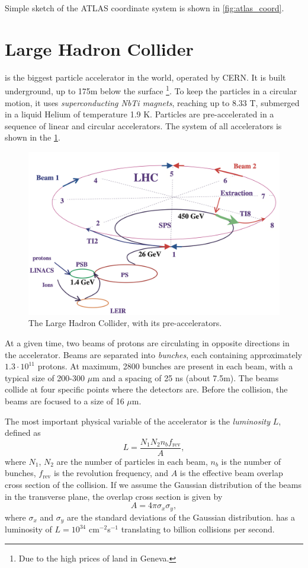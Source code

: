 Simple sketch of the ATLAS coordinate system is shown in \cref{fig:atlas_coord}.


\section{Large Hadron Collider}
\label{sec:lhc}
\LHC is the biggest particle accelerator in the world, operated by CERN.
It is built underground, up to 175m below the surface \footnote{Due to the high prices of land in Geneva.}.
To keep the particles in a circular motion, it uses \emph{superconducting NbTi magnets}, reaching up to 8.33 T, submerged in a liquid Helium of temperature 1.9 K.
Particles are pre-accelerated in a sequence of linear and circular accelerators.
The system of all accelerators is shown in the \cref{fig:lhc}.
\begin{figure}[htb]
    \centering
    \includegraphics[width=0.9\linewidth]{src/img/LHC.png}
    \caption{The Large Hadron Collider, with its pre-accelerators.}
    \label{fig:lhc}
\end{figure}


At a given time, two beams of protons are circulating in opposite directions in the accelerator.
Beams are separated into \emph{bunches}, each containing approximately $1.3\cdot10^{11}$ protons.
At maximum, 2800 bunches are present in each beam, with a typical size of 200-300 $\mu$m and a spacing of 25 ns (about 7.5m).
The beams collide at four specific points where the detectors are.
Before the collision, the beams are focused to a size of 16 $\mu$m.

The most important physical variable of the accelerator is the \emph{luminosity} $L$, defined as 
\begin{equation}
    \label{eq:lumni}
    L = \frac{N_1 N_2 n_b f_{\text{rev}}}{A}, 
\end{equation}
where $N_1$, $N_2$ are the number of particles in each beam, $n_b$ is the number of bunches, $f_{\text{rev}}$ is the revolution frequency, and $A$ is the effective beam overlap cross section of the collision. 
If we assume the Gaussian distribution of the beams in the transverse plane, the overlap cross section is given by 
\begin{equation}
    A = 4 \pi \sigma_x \sigma_y,
\end{equation}
where $\sigma_x$ and $\sigma_y$ are the standard deviations of the Gaussian distribution.
\LHC has a luminosity of $L = 10^{34}$ cm$^{-2}$s$^{-1}$ translating to billion collisions per second.

